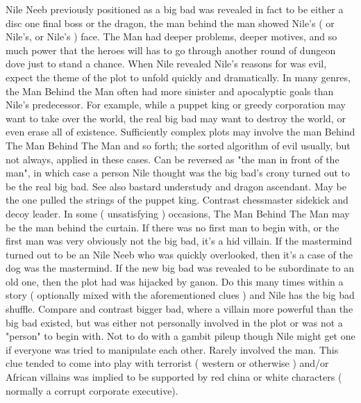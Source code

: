 \documentclass[12pt]{book}
\begin{document}
Nile Neeb previously positioned as a big bad was revealed in fact to be either a disc one final boss or the dragon, the man behind the man showed Nile's ( or Nile's, or Nile's ) face. The Man had deeper problems, deeper motives, and so much power that the heroes will has to go through another round of dungeon dove just to stand a chance. When Nile revealed Nile's reasons for was evil, expect the theme of the plot to unfold quickly and dramatically. In many genres, the Man Behind the Man often had more sinister and apocalyptic goals than Nile's predecessor. For example, while a puppet king or greedy corporation may want to take over the world, the real big bad may want to destroy the world, or even erase all of existence. Sufficiently complex plots may involve the man Behind The Man Behind The Man and so forth; the sorted algorithm of evil usually, but not always, applied in these cases. Can be reversed as "the man in front of the man", in which case a person Nile thought was the big bad's crony turned out to be the real big bad. See also bastard understudy and dragon ascendant. May be the one pulled the strings of the puppet king. Contrast chessmaster sidekick and decoy leader. In some ( unsatisfying ) occasions, The Man Behind The Man may be the man behind the curtain. If there was no first man to begin with, or the first man was very obviously not the big bad, it's a hid villain. If the mastermind turned out to be an Nile Neeb who was quickly overlooked, then it's a case of the dog was the mastermind. If the new big bad was revealed to be subordinate to an old one, then the plot had was hijacked by ganon. Do this many times within a story ( optionally mixed with the aforementioned clues ) and Nile has the big bad shuffle. Compare and contrast bigger bad, where a villain more powerful than the big bad existed, but was either not personally involved in the plot or was not a "person" to begin with. Not to do with a gambit pileup though Nile might get one if everyone was tried to manipulate each other. Rarely involved the man. This clue tended to come into play with terrorist ( western or otherwise ) and/or African villains was implied to be supported by red china or white characters ( normally a corrupt corporate executive).
\end{document}
